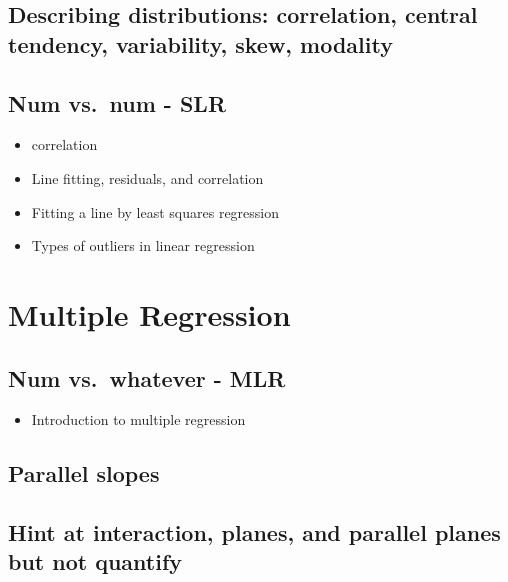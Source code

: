 \documentclass[]{book}
\providecommand{\tightlist}{%
  \setlength{\itemsep}{0pt}\setlength{\parskip}{0pt}}
\begin{document}
\hypertarget{describing-distributions-correlation-central-tendency-variability-skew-modality}{%
\section{Describing distributions: correlation, central tendency, variability, skew, modality}\label{describing-distributions-correlation-central-tendency-variability-skew-modality}}

\hypertarget{num-vs.num---slr}{%
\section{Num vs.~num - SLR}\label{num-vs.num---slr}}

\begin{itemize}
\tightlist
\item
  correlation
\item
  Line fitting, residuals, and correlation
\item
  Fitting a line by least squares regression
\item
  Types of outliers in linear regression
\end{itemize}

\hypertarget{mult-reg}{%
\chapter{Multiple Regression}\label{mult-reg}}

\hypertarget{num-vs.whatever---mlr}{%
\section{Num vs.~whatever - MLR}\label{num-vs.whatever---mlr}}

\begin{itemize}
\tightlist
\item
  Introduction to multiple regression
\end{itemize}

\hypertarget{parallel-slopes}{%
\section{Parallel slopes}\label{parallel-slopes}}

\hypertarget{hint-at-interaction-planes-and-parallel-planes-but-not-quantify}{%
\section{Hint at interaction, planes, and parallel planes but not quantify}\label{hint-at-interaction-planes-and-parallel-planes-but-not-quantify}}
\end{document}
